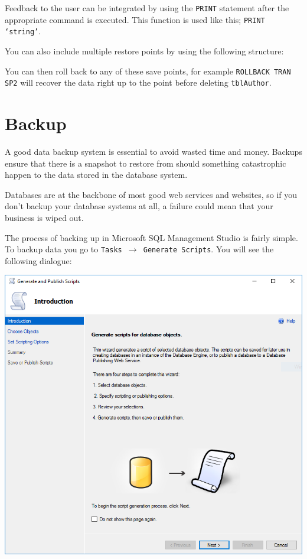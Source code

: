 \documentclass[11pt,a4paper]{scrartcl}
\begin{document}
	Feedback to the user can be integrated by using the \texttt{PRINT} statement after the appropriate command is executed. This function is used like this; \texttt{PRINT `string'}.
	
	You can also include multiple restore points by using the following structure:
	
	
	
	You can then roll back to any of these save points, for example \texttt{ROLLBACK TRAN SP2} will recover the data right up to the point before deleting \texttt{tblAuthor}.
	
	\section{Backup}\label{backup}
	
	A good data backup system is essential to avoid wasted time and money. Backups ensure that there is a snapshot to restore from should something catastrophic happen to the data stored in the database system.
	
	Databases are at the backbone of most good web services and websites, so if you don't backup your database systems at all, a failure could mean that your business is wiped out.
	
	The process of backing up in Microsoft SQL Management Studio is fairly simple. To backup data you go to \texttt{Tasks $\rightarrow$ Generate Scripts}. You will see the following dialogue:
	
	\begin{center}
		\includegraphics[width=0.85\linewidth]{images/GenerateScripts}
	\end{center}
	
\end{document}
